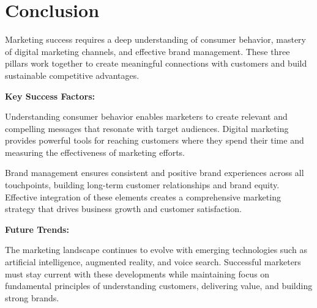 \documentclass[12pt]{article}
\begin{document}
\section{Conclusion}

Marketing success requires a deep understanding of consumer behavior, mastery of digital marketing channels, and effective brand management. These three pillars work together to create meaningful connections with customers and build sustainable competitive advantages.

\textbf{Key Success Factors:}

Understanding consumer behavior enables marketers to create relevant and compelling messages that resonate with target audiences. Digital marketing provides powerful tools for reaching customers where they spend their time and measuring the effectiveness of marketing efforts.

Brand management ensures consistent and positive brand experiences across all touchpoints, building long-term customer relationships and brand equity. Effective integration of these elements creates a comprehensive marketing strategy that drives business growth and customer satisfaction.

\textbf{Future Trends:}

The marketing landscape continues to evolve with emerging technologies such as artificial intelligence, augmented reality, and voice search. Successful marketers must stay current with these developments while maintaining focus on fundamental principles of understanding customers, delivering value, and building strong brands.
\end{document}
